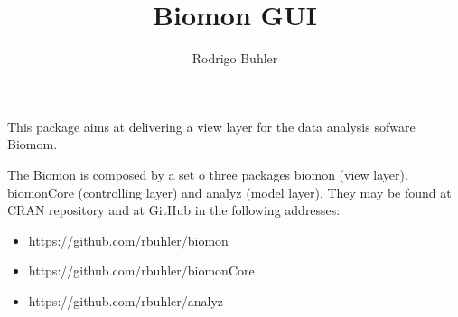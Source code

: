 \documentclass{article}
\title{Biomon GUI}
\author{Rodrigo Buhler}
\begin{document}

\maketitle

This package aims at delivering a view layer for the data analysis sofware Biomom.

The Biomon is composed by a set o three packages biomon (view layer), biomonCore (controlling layer) and analyz (model layer). They may be found at CRAN repository and at GitHub in the following addresses:
  \begin{itemize}
    \item https://github.com/rbuhler/biomon
    \item https://github.com/rbuhler/biomonCore
    \item https://github.com/rbuhler/analyz
  \end{itemize}
\end{document}
